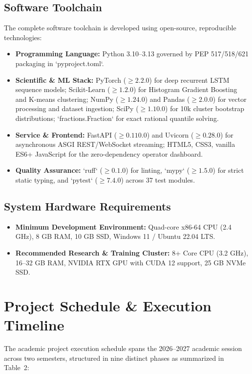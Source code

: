 \documentclass[12pt,a4paper]{article}
\begin{document}
\subsection{Software Toolchain}
The complete software toolchain is developed using open-source, reproducible technologies:
\begin{itemize}[leftmargin=1.5em]
    \item \textbf{Programming Language:} Python 3.10--3.13 governed by PEP 517/518/621 packaging in `pyproject.toml`.
    \item \textbf{Scientific & ML Stack:} PyTorch ($\ge 2.2.0$) for deep recurrent LSTM sequence models; Scikit-Learn ($\ge 1.2.0$) for Histogram Gradient Boosting and K-means clustering; NumPy ($\ge 1.24.0$) and Pandas ($\ge 2.0.0$) for vector processing and dataset ingestion; SciPy ($\ge 1.10.0$) for 10k cluster bootstrap distributions; `fractions.Fraction` for exact rational quantile solving.
    \item \textbf{Service & Frontend:} FastAPI ($\ge 0.110.0$) and Uvicorn ($\ge 0.28.0$) for asynchronous ASGI REST/WebSocket streaming; HTML5, CSS3, vanilla ES6+ JavaScript for the zero-dependency operator dashboard.
    \item \textbf{Quality Assurance:} `ruff` ($\ge 0.1.0$) for linting, `mypy` ($\ge 1.5.0$) for strict static typing, and `pytest` ($\ge 7.4.0$) across 37 test modules.
\end{itemize}

\subsection{System Hardware Requirements}
\begin{itemize}[leftmargin=1.5em]
    \item \textbf{Minimum Development Environment:} Quad-core x86-64 CPU (2.4 GHz), 8 GB RAM, 10 GB SSD, Windows 11 / Ubuntu 22.04 LTS.
    \item \textbf{Recommended Research & Training Cluster:} 8+ Core CPU (3.2 GHz), 16--32 GB RAM, NVIDIA RTX GPU with CUDA 12 support, 25 GB NVMe SSD.
\end{itemize}

\section{Project Schedule \& Execution Timeline}
The academic project execution schedule spans the 2026--2027 academic session across two semesters, structured in nine distinct phases as summarized in Table~2:
\end{document}
